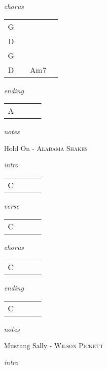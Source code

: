 \documentclass[12pt]{article}
\begin{document}
\textit{chorus}

\begin{tabular}{|P{1.25in}|P{1.25in}|P{1.25in}|P{1.25in}|}
  G &   &   &   \\
  D &   &   &   \\
  G &   &   &   \\
  D &   & Am7  &   \\
\end{tabular}

\textit{ending}

\begin{tabular}{|P{1.25in}|P{1.25in}|P{1.25in}|P{1.25in}|}
  A &   &   &   \\
\end{tabular}

\textit{notes}

\newpage

{\Huge Hold On} {\huge - \textsc{Alabama Shakes}}

\huge
\textit{intro}

\begin{tabular}{|P{1.25in}|P{1.25in}|P{1.25in}|P{1.25in}|}
  C &   &   &   \\
\end{tabular}

\textit{verse}

\begin{tabular}{|P{1.25in}|P{1.25in}|P{1.25in}|P{1.25in}|}
  C &   &   &   \\
\end{tabular}

\textit{chorus}

\begin{tabular}{|P{1.25in}|P{1.25in}|P{1.25in}|P{1.25in}|}
  C &   &   &   \\
\end{tabular}

\textit{ending}

\begin{tabular}{|P{1.25in}|P{1.25in}|P{1.25in}|P{1.25in}|}
  C &   &   &   \\
\end{tabular}

\textit{notes}

\newpage

{\Huge Mustang Sally} {\huge - \textsc{Wilson Pickett}}

\huge
\textit{intro}
\end{document}
